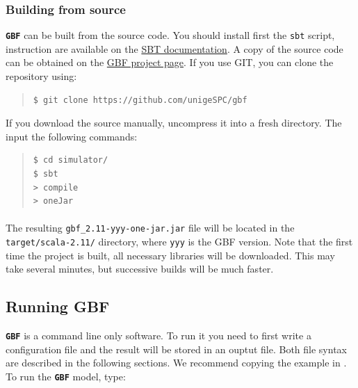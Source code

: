 \documentclass[10pt,a4paper]{article}
\begin{document}
\subsubsection{Building from source}
\label{sec-2-2}

\textbf{\texttt{\textsf{\color{namecolor}GBF}}} can be built from the source code. You should install first the
\texttt{sbt} script, instruction are available on the \href{http://www.scala-sbt.org/0.13/tutorial/Manual-Installation.html}{SBT documentation}. A copy of the source code can be obtained on the \href{http://example}{GBF project page}. If
you use GIT, you can clone the repository using:

\begin{quote}
\begin{verbatim}
$ git clone https://github.com/unigeSPC/gbf
\end{verbatim}
\end{quote}

If you download the source manually, uncompress it into a fresh directory. The
input the following commands:

\begin{quote}
\begin{verbatim}
$ cd simulator/
$ sbt
> compile
> oneJar
\end{verbatim}
\end{quote}

\paragraph{} The resulting \verb+gbf_2.11-yyy-one-jar.jar+ file will be located in the \texttt{target/scala-2.11/}
directory, where \texttt{yyy} is the GBF version. Note that the first
time the project is built, all necessary libraries will be
downloaded. This may take several minutes, but successive builds will
be much faster.

\subsection{Running GBF}
\label{sec-3}

\textbf{\texttt{\textsf{\color{namecolor}GBF}}} is a command line only software. To run it you need to first write
a configuration file and the result will be stored in an ouptut file.
Both file syntax are described in the following sections. We recommend
copying the example in . To run the \textbf{\texttt{\textsf{\color{namecolor}GBF}}} model, type:
\end{document}
